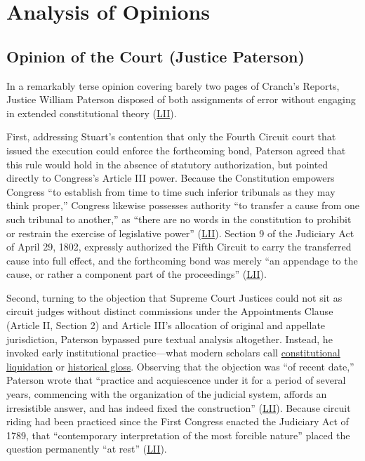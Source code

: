 \documentclass[12pt]{article}
\begin{document}
\section{Analysis of Opinions}

\subsection{Opinion of the Court (Justice Paterson)}

In a remarkably terse opinion covering barely two pages of Cranch's Reports, Justice William Paterson disposed of both assignments of error without engaging in extended constitutional theory (\href{https://www.law.cornell.edu/supremecourt/text/5/299}{LII}).

First, addressing Stuart's contention that only the Fourth Circuit court that issued the execution could enforce the forthcoming bond, Paterson agreed that this rule would hold in the absence of statutory authorization, but pointed directly to Congress's Article III power. Because the Constitution empowers Congress ``to establish from time to time such inferior tribunals as they may think proper,'' Congress likewise possesses authority ``to transfer a cause from one such tribunal to another,'' as ``there are no words in the constitution to prohibit or restrain the exercise of legislative power'' (\href{https://www.law.cornell.edu/supremecourt/text/5/299}{LII}). Section 9 of the Judiciary Act of April 29, 1802, expressly authorized the Fifth Circuit to carry the transferred cause into full effect, and the forthcoming bond was merely ``an appendage to the cause, or rather a component part of the proceedings'' (\href{https://www.law.cornell.edu/supremecourt/text/5/299}{LII}).

Second, turning to the objection that Supreme Court Justices could not sit as circuit judges without distinct commissions under the Appointments Clause (Article II, Section 2) and Article III's allocation of original and appellate jurisdiction, Paterson bypassed pure textual analysis altogether. Instead, he invoked early institutional practice---what modern scholars call \href{https://review.law.stanford.edu/wp-content/uploads/sites/3/2019/01/Baude-71-Stan.-L.-Rev.-1-2019.pdf}{constitutional liquidation} or \href{https://virginialawreview.org/articles/historical-gloss-madisonian-liquidation-and-originalism-debate/}{historical gloss}. Observing that the objection was ``of recent date,'' Paterson wrote that ``practice and acquiescence under it for a period of several years, commencing with the organization of the judicial system, affords an irresistible answer, and has indeed fixed the construction'' (\href{https://www.law.cornell.edu/supremecourt/text/5/299}{LII}). Because circuit riding had been practiced since the First Congress enacted the Judiciary Act of 1789, that ``contemporary interpretation of the most forcible nature'' placed the question permanently ``at rest'' (\href{https://www.law.cornell.edu/supremecourt/text/5/299}{LII}).
\end{document}
